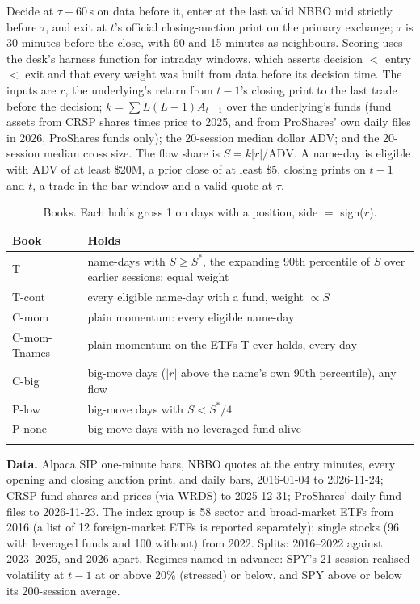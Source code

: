 \documentclass[10pt, a4paper, twocolumn]{article}
\renewcommand{\toprule}{\arrayrulecolor{qnavy}\specialrule{\heavyrulewidth}{\abovetopsep}{\belowrulesep}\arrayrulecolor{black}}
\renewcommand{\bottomrule}{\arrayrulecolor{qnavy}\specialrule{\heavyrulewidth}{\aboverulesep}{\belowbottomsep}\arrayrulecolor{black}}
\newcommand{\qstripes}{\rowcolors{2}{qstripe}{white}}
\newcommand{\qhead}[1]{\textbf{\color{qnavy}#1}}
\newcommand{\qsource}[1]{\par\vspace{1pt}{\footnotesize\color{black!60}\textit{Source:} #1}\par}
\begin{document}
Decide at $\tau - 60$\,s on data before it, enter at the last valid NBBO mid strictly before $\tau$, and exit at $t$'s official closing-auction print on the primary exchange; $\tau$ is 30 minutes before the close, with 60 and 15 minutes as neighbours. Scoring uses the desk's harness function for intraday windows, which asserts decision $<$ entry $<$ exit and that every weight was built from data before its decision time. The inputs are $r$, the underlying's return from $t-1$'s closing print to the last trade before the decision; $k = \sum L(L-1)A_{t-1}$ over the underlying's funds (fund assets from CRSP shares times price to 2025, and from ProShares' own daily files in 2026, ProShares funds only); the 20-session median dollar ADV; and the 20-session median cross size. The flow share is $S = k|r|/\text{ADV}$. A name-day is eligible with ADV of at least \$20M, a prior close of at least \$5, closing prints on $t-1$ and $t$, a trade in the bar window and a valid quote at $\tau$.

\begin{table}[H]
\centering
\caption{Books. Each holds gross 1 on days with a position, side $=$ sign($r$).}
\label{tab:c_books}
\footnotesize
\qstripes
\begin{tabularx}{\columnwidth}{@{}l>{\raggedright\arraybackslash}X@{}}
\toprule
\qhead{Book} & \qhead{Holds} \\
\midrule
T & name-days with $S \geq S^{*}$, the expanding 90th percentile of $S$ over earlier sessions; equal weight \\
T-cont & every eligible name-day with a fund, weight $\propto S$ \\
C-mom & plain momentum: every eligible name-day \\
C-mom-Tnames & plain momentum on the ETFs T ever holds, every day \\
C-big & big-move days ($|r|$ above the name's own 90th percentile), any flow \\
P-low & big-move days with $S < S^{*}/4$ \\
P-none & big-move days with no leveraged fund alive \\
\bottomrule
\end{tabularx}
\qsource{Study design.}
\end{table}

\textbf{Data.} Alpaca SIP one-minute bars, NBBO quotes at the entry minutes, every opening and closing auction print, and daily bars, 2016-01-04 to 2026-11-24; CRSP fund shares and prices (via WRDS) to 2025-12-31; ProShares' daily fund files to 2026-11-23. The index group is 58 sector and broad-market ETFs from 2016 (a list of 12 foreign-market ETFs is reported separately); single stocks (96 with leveraged funds and 100 without) from 2022. Splits: 2016--2022 against 2023--2025, and 2026 apart. Regimes named in advance: SPY's 21-session realised volatility at $t-1$ at or above 20\% (stressed) or below, and SPY above or below its 200-session average.
\end{document}
